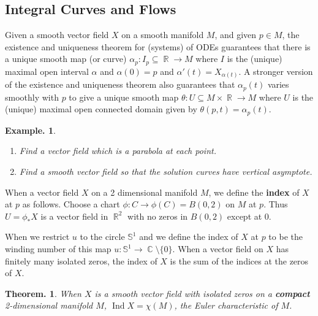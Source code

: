 \documentclass[11pt, a4paper]{memoir}
\DeclareMathOperator{\R}{{\mathbb{R}}}
\DeclareMathOperator{\C}{{\mathbb{C}}}
\theoremstyle{change}
\newtheorem{theorem}{Theorem.}[section]
\theoremstyle{plain}
\theoremstyle{nonumberplain}
\newtheorem{example}{Example.}
\DeclareMathOperator{\Ind}{Ind}
\numberwithin{equation}{section}
\begin{document}
\subsection{Integral Curves and Flows}
Given a smooth vector field $X$ on a smooth manifold $M$, and given $p\in M$, the existence and uniqueness theorem for (systems) of ODEs guarantees that there is a unique smooth map (or curve) $\alpha_p:I_p\subseteq\R\to M$ where $I$ is the (unique) maximal open interval $\alpha$ and $\alpha(0)=p$ and $\alpha'(t)=X_{\alpha(t)}$.
A stronger version of the existence and uniqueness theorem also guarantees that $\alpha_p(t)$ varies smoothly with $p$ to give a unique smooth map $\theta:U\subseteq M\times\R\to M$ where $U$ is the (unique) maximal open connected domain given by $\theta(p,t)=\alpha_p(t)$.

\begin{example}
    \begin{enumerate}[nl,r]
        \item Find a vector field which is a parabola at each point.
        \item Find a smooth vector field so that the solution curves have vertical asymptote.
    \end{enumerate}
\end{example}

When a vector field $X$ on a 2 dimensional manifold $M$, we define the \textbf{index} of $X$ at $p$ as follows.
Choose a chart $\phi:C\to\phi(C)=B(0,2)$ on $M$ at $p$.
Thus $U=\phi_*X$ is a vector field in $\R^2$ with no zeros in $B(0,2)$ except at $0$.

When we restrict $u$ to the circle $\mathbb{S}^1$ and we define the index of $X$ at $p$ to be the winding number of this map $u:\mathbb{S}^1\to\C\setminus\{0\}$.
When a vector field on $X$ has finitely many isolated zeros, the index of $X$ is the sum of the indices at the zeros of $X$.
\begin{theorem}
    When $X$ is a smooth vector field with isolated zeros on a \textbf{compact} 2-dimensional manifold $M$, $\Ind X=\chi(M)$, the Euler characteristic of $M$.
\end{theorem}
\end{document}
